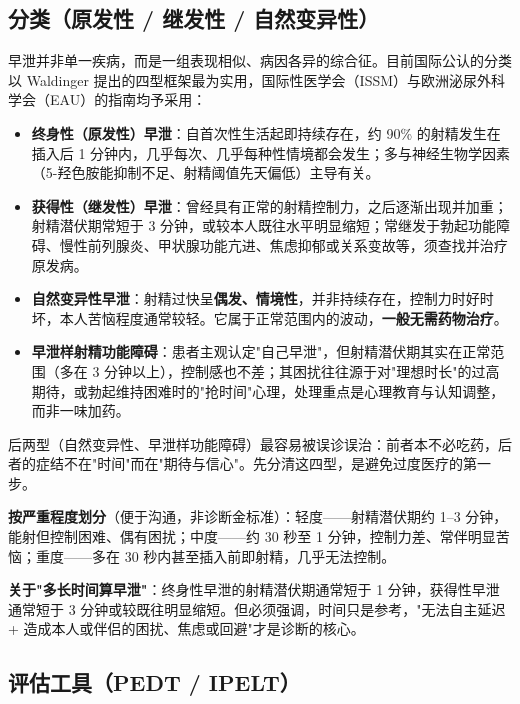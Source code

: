 \subsection{分类（原发性 / 继发性 / 自然变异性）}

早泄并非单一疾病，而是一组表现相似、病因各异的综合征。目前国际公认的分类以 Waldinger 提出的四型框架最为实用，国际性医学会（ISSM）与欧洲泌尿外科学会（EAU）的指南均予采用：

\begin{itemize}
	\item \textbf{终身性（原发性）早泄}：自首次性生活起即持续存在，约 90\% 的射精发生在插入后 1 分钟内，几乎每次、几乎每种性情境都会发生；多与神经生物学因素（5-羟色胺能抑制不足、射精阈值先天偏低）主导有关。
	\item \textbf{获得性（继发性）早泄}：曾经具有正常的射精控制力，之后逐渐出现并加重；射精潜伏期常短于 3 分钟，或较本人既往水平明显缩短；常继发于勃起功能障碍、慢性前列腺炎、甲状腺功能亢进、焦虑抑郁或关系变故等，须查找并治疗原发病。
	\item \textbf{自然变异性早泄}：射精过快呈\textbf{偶发、情境性}，并非持续存在，控制力时好时坏，本人苦恼程度通常较轻。它属于正常范围内的波动，\textbf{一般无需药物治疗}。
	\item \textbf{早泄样射精功能障碍}：患者主观认定"自己早泄"，但射精潜伏期其实在正常范围（多在 3 分钟以上），控制感也不差；其困扰往往源于对"理想时长"的过高期待，或勃起维持困难时的"抢时间"心理，处理重点是心理教育与认知调整，而非一味加药。
\end{itemize}

\begin{tcolorbox}[colback=pink!5!white,colframe=red!50!black,title=贴心小叮咛]
后两型（自然变异性、早泄样功能障碍）最容易被误诊误治：前者本不必吃药，后者的症结不在"时间"而在"期待与信心"。先分清这四型，是避免过度医疗的第一步。
\end{tcolorbox}

\noindent\textbf{按严重程度划分}（便于沟通，非诊断金标准）：轻度——射精潜伏期约 1--3 分钟，能射但控制困难、偶有困扰；中度——约 30 秒至 1 分钟，控制力差、常伴明显苦恼；重度——多在 30 秒内甚至插入前即射精，几乎无法控制。

\noindent\textbf{关于"多长时间算早泄"}：终身性早泄的射精潜伏期通常短于 1 分钟，获得性早泄通常短于 3 分钟或较既往明显缩短。但必须强调，时间只是参考，"无法自主延迟 + 造成本人或伴侣的困扰、焦虑或回避"才是诊断的核心。

\subsection{评估工具（PEDT / IPELT）}

